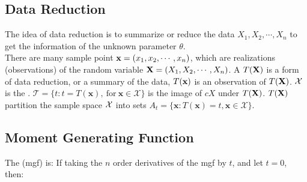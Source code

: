 \documentclass[10pt]{report}
\begin{document}
\subsection{Data Reduction}

The idea of data reduction is to summarize or reduce the data $X_1, X_2,\cdots, X_n$ to get the information of the unknown parameter $\theta$.\\
There are many sample point $\bold{x}=(x_1,x_2,\cdots,x_n)$, which are realizations (observations) of the random variable $\bold{X}=(X_1,X_2,\cdots,X_n)$.
A  $T(\bold{X})$ is a form of data reduction, or a summary of the data, $T(\bold{x})$ is an observation of $T(\bold{X})$. $\mathcal{X}$ is
the . $\mathcal{T}=\{t:t=T(\mathbf{x}),\mathrm{~for~}\mathbf{x}\in\mathcal{X}\}$ is the image of $cX$ under $T(\bold{X})$.
$T(\bold{X})$ partition the sample space $\mathcal{X}$ into sets $A_t=\{\mathbf{x}:T(\mathbf{x})=t,\mathbf{x}\in\mathcal{X}\}$.

\subsection{Moment Generating Function}
The  (mgf) is:
If taking the $n$ order derivatives of the mgf by $t$, and let $t=0$, then:
\end{document}

